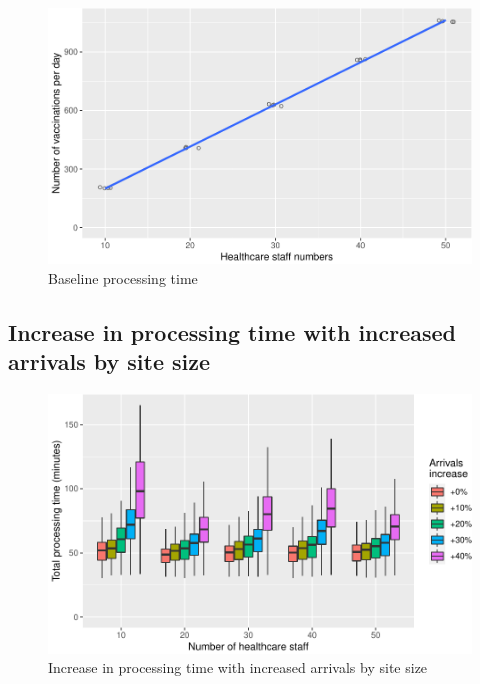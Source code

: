 \documentclass{article}
\begin{document}
\begin{figure}[h]

{\centering \includegraphics{Preprint_files/figure-latex/baselineThroughput-1} 

}

\caption{Baseline processing time}\label{fig:baselineThroughput}
\end{figure}

\hypertarget{increase-in-processing-time-with-increased-arrivals-by-site-size}{%
\subsection{Increase in processing time with increased arrivals by site
size}\label{increase-in-processing-time-with-increased-arrivals-by-site-size}}

\begin{figure}[h]

{\centering \includegraphics{Preprint_files/figure-latex/processingTimeTest-1} 

}

\caption{Increase in processing time with increased arrivals by site size}\label{fig:processingTimeTest}
\end{figure}
\end{document}
